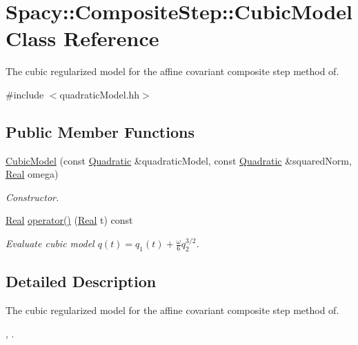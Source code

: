 \hypertarget{classSpacy_1_1CompositeStep_1_1CubicModel}{\section{\-Spacy\-:\-:\-Composite\-Step\-:\-:\-Cubic\-Model \-Class \-Reference}
\label{classSpacy_1_1CompositeStep_1_1CubicModel}
}


\-The cubic regularized model for the affine covariant composite step method of.  




{\ttfamily \#include $<$quadratic\-Model.\-hh$>$}

\subsection*{\-Public \-Member \-Functions}
\begin{DoxyCompactItemize}
\item 
\hyperlink{classSpacy_1_1CompositeStep_1_1CubicModel_a4a2a99c33d52de96cfc97991d8b47654}{\-Cubic\-Model} (const \hyperlink{classSpacy_1_1Quadratic}{\-Quadratic} \&quadratic\-Model, const \hyperlink{classSpacy_1_1Quadratic}{\-Quadratic} \&squared\-Norm, \hyperlink{classSpacy_1_1Real}{\-Real} omega)
\begin{DoxyCompactList}\small\item\em \-Constructor. \end{DoxyCompactList}\item 
\hyperlink{classSpacy_1_1Real}{\-Real} \hyperlink{classSpacy_1_1CompositeStep_1_1CubicModel_a5669f387117cfdc47b5be45a29f387ce}{operator()} (\hyperlink{classSpacy_1_1Real}{\-Real} t) const 
\begin{DoxyCompactList}\small\item\em \-Evaluate cubic model $ q(t) = q_1(t) + \frac{\omega}{6}q_2^{3/2} $. \end{DoxyCompactList}\end{DoxyCompactItemize}


\subsection{\-Detailed \-Description}
\-The cubic regularized model for the affine covariant composite step method of. 

\cite{Lubkoll2015}, \cite{Lubkoll2015a}. 

